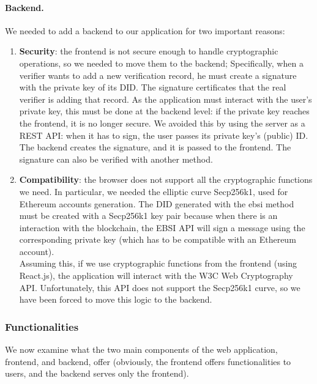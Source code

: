 \paragraph{Backend.}
We needed to add a backend to our application for two important reasons:
\begin{enumerate}
    \item \textbf{Security}: the frontend is not secure enough to handle cryptographic
    operations, so we needed to move them to the backend; Specifically, when a 
    verifier wants to add a new verification record, he must create a signature with 
    the private key of its DID. The signature certificates that the real verifier is
    adding that record. As the application must interact with the user's private key, 
    this must be done at the backend level: if the private key reaches the frontend, 
    it is no longer secure. We avoided this by using the server as a REST API: when 
    it has to sign, the user passes its private key's (public) ID. The backend creates
    the signature, and it is passed to the frontend. The signature can also be 
    verified with another method.
    \item \textbf{Compatibility}: the browser does not support all the cryptographic
    functions we need. In particular, we needed the elliptic curve Secp256k1, used 
    for Ethereum accounts generation. The DID generated with the ebsi method must be 
    created with a Secp256k1 key pair because when there is an interaction with the 
    blockchain, the EBSI API will sign a message using the corresponding private key
    (which has to be compatible with an Ethereum account).\\
    Assuming this, if we use cryptographic functions from the frontend (using 
    React.js), the application will interact with the W3C Web Cryptography API\cite{site:w3ccrypto}. 
    Unfortunately, this API does not support the Secp256k1 curve, so we have been 
    forced to move this logic to the backend. 
\end{enumerate}

\subsubsection{Functionalities}
We now examine what the two main components of the web application, frontend, and 
backend, offer (obviously, the frontend offers functionalities to users, and the 
backend serves only the frontend).

